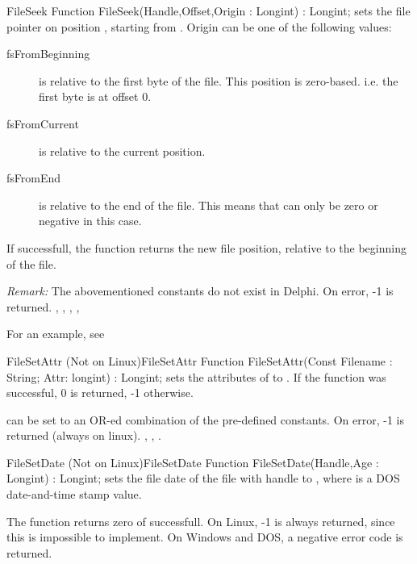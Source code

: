 

\begin{function}{FileSeek}
\Declaration
Function FileSeek(Handle,Offset,Origin : Longint) : Longint;
\Description
{} sets the file pointer on position , starting from
. Origin can be one of the following values:
\begin{description}
\item[fsFromBeginning]   is relative to the first byte of the file. This
position is zero-based. i.e. the first byte is at offset 0.
\item[fsFromCurrent]   is relative to the current position.
\item[fsFromEnd]  is relative to the end of the file. This means
that  can only be zero or negative in this case.
\end{description}
If successfull, the function returns the new file position, relative to the
beginning of the file.

{\em Remark:} The abovementioned constants do not exist in Delphi.
\Errors
On error, -1 is returned.
\SeeAlso
{}, , , 
, 
\end{function}



For an example, see 

\begin{functionl}{FileSetAttr (Not on Linux)}{FileSetAttr}
\Declaration
Function FileSetAttr(Const Filename : String; Attr: longint) : Longint;
\Description
{} sets the attributes of  to .
If the function was successful, 0 is returned, -1 otherwise.

 can be set to an OR-ed combination of the pre-defined
 constants.
\Errors
On error, -1 is returned (always on linux).
\SeeAlso
{}, , .
\end{functionl}


\begin{functionl}{FileSetDate (Not on Linux)}{FileSetDate}
\Declaration
Function FileSetDate(Handle,Age : Longint) : Longint;
\Description
{} sets the file date of the file with handle 
to , where  is a DOS date-and-time stamp value.

The function returns zero of successfull.
\Errors
On Linux, -1 is always returned, since this is impossible to implement.
On Windows and DOS, a negative error code is returned.
\SeeAlso
\end{functionl}


